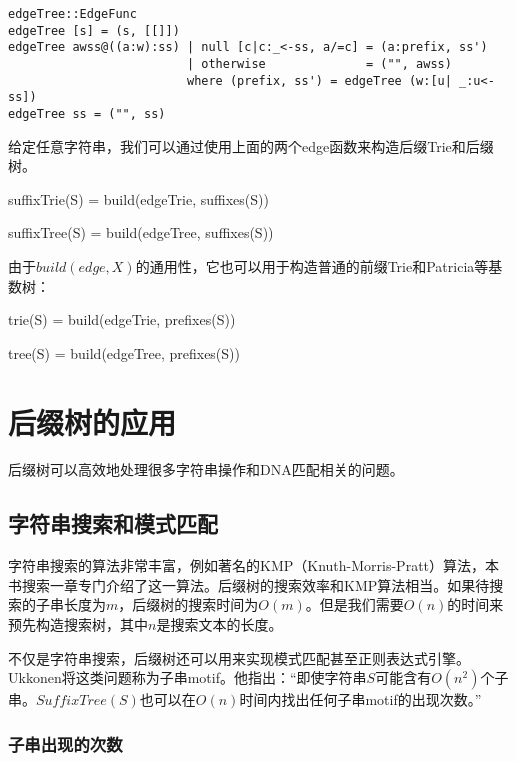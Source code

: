 \documentclass[UTF8]{article}
\begin{document}
\begin{lstlisting}[style=Haskell]
edgeTree::EdgeFunc
edgeTree [s] = (s, [[]])
edgeTree awss@((a:w):ss) | null [c|c:_<-ss, a/=c] = (a:prefix, ss')
                         | otherwise              = ("", awss)
                         where (prefix, ss') = edgeTree (w:[u| _:u<-ss])
edgeTree ss = ("", ss)
\end{lstlisting}

给定任意字符串，我们可以通过使用上面的两个edge函数来构造后缀Trie和后缀树。

\be
suffixTrie(S) = build(edgeTrie, suffixes(S))
\ee

\be
suffixTree(S) = build(edgeTree, suffixes(S))
\ee

由于$build(edge, X)$的通用性，它也可以用于构造普通的前缀Trie和Patricia等基数树：

\be
trie(S) = build(edgeTrie, prefixes(S))
\ee

\be
tree(S) = build(edgeTree, prefixes(S))
\ee


\section{后缀树的应用}

后缀树可以高效地处理很多字符串操作和DNA匹配相关的问题。

\subsection{字符串搜索和模式匹配}
\label{substring-lookup}

字符串搜索的算法非常丰富，例如著名的KMP（Knuth-Morris-Pratt）算法，本书搜索一章专门介绍了这一算法。后缀树的搜索效率和KMP算法相当\cite{Gusfield-book}。如果待搜索的子串长度为$m$，后缀树的搜索时间为$O(m)$。但是我们需要$O(n)$的时间来预先构造搜索树，其中$n$是搜索文本的长度\cite{lallison-stree}。

不仅是字符串搜索，后缀树还可以用来实现模式匹配甚至正则表达式引擎。Ukkonen将这类问题称为子串motif。他指出：“即使字符串$S$可能含有$O(n^2)$个子串。$SuffixTree(S)$也可以在$O(n)$时间内找出任何子串motif的出现次数。”

\subsubsection{子串出现的次数}
\end{document}

